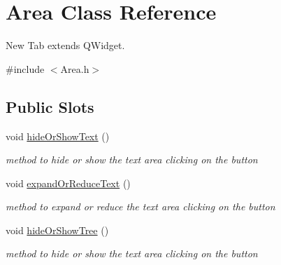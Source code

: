 \hypertarget{class_area}{\section{\-Area \-Class \-Reference}
\label{class_area}
}


\-New \-Tab extends \-Q\-Widget.  




{\ttfamily \#include $<$\-Area.\-h$>$}

\subsection*{\-Public \-Slots}
\begin{DoxyCompactItemize}
\item 
\hypertarget{class_area_a36014f76da996d4d3177fab5af44b42d}{void \hyperlink{class_area_a36014f76da996d4d3177fab5af44b42d}{hide\-Or\-Show\-Text} ()}\label{class_area_a36014f76da996d4d3177fab5af44b42d}

\begin{DoxyCompactList}\small\item\em method to hide or show the text area clicking on the button \end{DoxyCompactList}\item 
\hypertarget{class_area_a124912e5857e74fe14f65b15330a493b}{void \hyperlink{class_area_a124912e5857e74fe14f65b15330a493b}{expand\-Or\-Reduce\-Text} ()}\label{class_area_a124912e5857e74fe14f65b15330a493b}

\begin{DoxyCompactList}\small\item\em method to expand or reduce the text area clicking on the button \end{DoxyCompactList}\item 
\hypertarget{class_area_a2972e1d905e8e118d51903e4fccb3648}{void \hyperlink{class_area_a2972e1d905e8e118d51903e4fccb3648}{hide\-Or\-Show\-Tree} ()}\label{class_area_a2972e1d905e8e118d51903e4fccb3648}

\begin{DoxyCompactList}\small\item\em method to hide or show the text area clicking on the button \end{DoxyCompactList}\end{DoxyCompactItemize}
